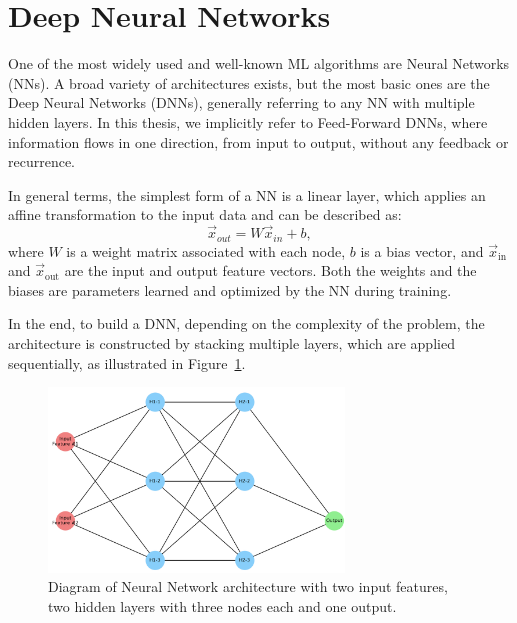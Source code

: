 \section{Deep Neural Networks}
\label{sec:dnn_general}

One of the most widely used and well-known ML algorithms are Neural Networks (NNs). A broad variety of architectures exists, but the most basic ones are the Deep Neural Networks (DNNs), generally referring to any NN with multiple hidden layers. In this thesis, we implicitly refer to Feed-Forward DNNs, where information flows in one direction, from input to output, without any feedback or recurrence.

In general terms, the simplest form of a NN is a linear layer, which applies an affine transformation to the input data and can be described as:
\begin{equation}
    \vec{x}_{out} = W\vec{x}_{in} + b,
\end{equation}
where $W$ is a weight matrix associated with each node, $b$ is a bias vector, and $\vec{x}_{\text{in}}$ and $\vec{x}_{\text{out}}$ are the input and output feature vectors. Both the weights and the biases are parameters learned and optimized by the NN during training.

In the end, to build a DNN, depending on the complexity of the problem, the architecture is constructed by stacking multiple layers, which are applied sequentially, as illustrated in Figure~\ref{fig:dnn}.
\begin{figure}[htbp]
    \centering
    \includegraphics[width=0.7\textwidth]{images/dnn.png}
    \caption{Diagram of Neural Network architecture with two input features, two hidden layers with three nodes each and one output.}
    \label{fig:dnn}
  \end{figure}

